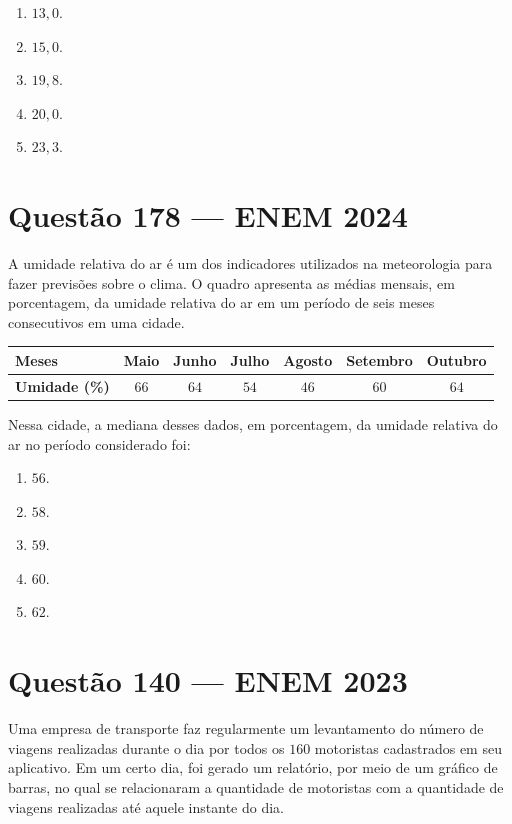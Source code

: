 \documentclass[11pt,a4paper]{article}
\begin{document}
\begin{enumerate}[label=(\Alph*)]
    \item $13{,}0$.
    \item $15{,}0$.
    \item $19{,}8$.
    \item $20{,}0$.
    \item $23{,}3$.
\end{enumerate}

\section*{Questão 178 --- ENEM 2024}

A umidade relativa do ar é um dos indicadores utilizados na meteorologia para fazer previsões sobre o clima. O quadro apresenta as médias mensais, em porcentagem, da umidade relativa do ar em um período de seis meses consecutivos em uma cidade.

\begin{center}
    \begin{tabular}{|l|c|c|c|c|c|c|}
        \hline
        \textbf{Meses}        & Maio & Junho & Julho & Agosto & Setembro & Outubro \\ \hline
        \textbf{Umidade (\%)} & $66$ & $64$  & $54$  & $46$   & $60$     & $64$    \\ \hline
    \end{tabular}
\end{center}

Nessa cidade, a mediana desses dados, em porcentagem, da umidade relativa do ar no período considerado foi:

\begin{enumerate}[label=(\Alph*)]
    \item $56$.
    \item $58$.
    \item $59$.
    \item $60$.
    \item $62$.
\end{enumerate}

\section*{Questão 140 --- ENEM 2023}

Uma empresa de transporte faz regularmente um levantamento do número de viagens realizadas durante o dia por todos os $160$ motoristas cadastrados em seu aplicativo. Em um certo dia, foi gerado um relatório, por meio de um gráfico de barras, no qual se relacionaram a quantidade de motoristas com a quantidade de viagens realizadas até aquele instante do dia.
\end{document}
